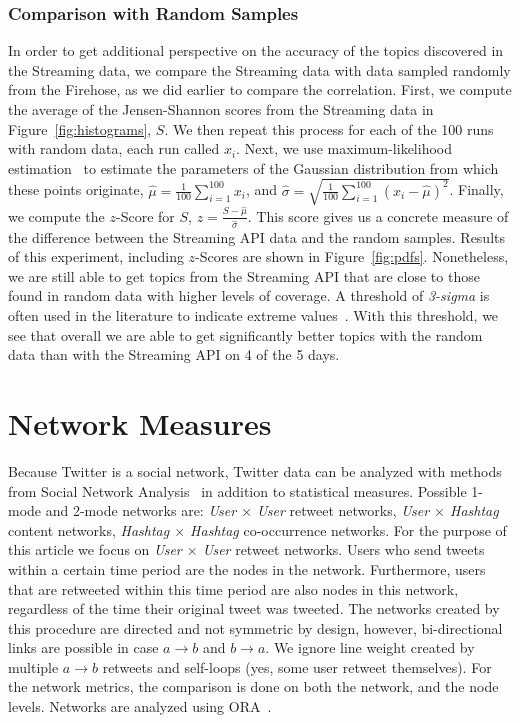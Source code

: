 \documentclass[letterpaper]{article}
\begin{document}
\subsubsection{Comparison with Random Samples}
In order to get additional perspective on the accuracy of the topics discovered in the Streaming data, we compare the Streaming data with data sampled randomly from the Firehose, as we did earlier to compare the correlation. First, we compute the average of the Jensen-Shannon scores from the Streaming data in Figure~\ref{fig:histograms}, $S$. We then repeat this process for each of the 100 runs with random data, each run called $x_i$. Next, we use maximum-likelihood estimation~\cite{casella2001statistical} to estimate the parameters of the Gaussian distribution from which these points originate, $\hat{\mu} = \frac{1}{100} \sum_{i = 1}^{100} x_i$, and $\hat{\sigma} = \sqrt{\frac{1}{100}\sum_{i = 1}^{100}(x_i - \hat{\mu})^2}$. Finally, we compute the $z$-Score for $S$, $z = \frac{S - \hat{\mu}}{\hat{\sigma}}$. This score gives us a concrete measure of the difference between the Streaming API data and the random samples. Results of this experiment, including $z$-Scores are shown in Figure~\ref{fig:pdfs}. Nonetheless, we are still able to get topics from the Streaming API that are close to those found in random data with higher levels of coverage. A threshold of \emph{3-sigma} is often used in the literature to indicate extreme values~\cite[Section 6.3.1]{nist02}. With this threshold, we see that overall we are able to get significantly better topics with the random data than with the Streaming API on 4 of the 5 days.

\section{Network Measures}
Because Twitter is a social network, Twitter data can be analyzed with methods from Social Network Analysis~\cite{Wasserman1994} in addition to statistical measures. Possible 1-mode and 2-mode networks are: \emph{User $\times$ User} retweet networks, \emph{User $\times$ Hashtag} content networks, \emph{Hashtag $\times$ Hashtag} co-occurrence networks. For the purpose of this article we focus on \emph{User $\times$ User} retweet networks. Users who send tweets within a certain time period are the nodes in the network. Furthermore, users that are retweeted within this time period are also nodes in this network, regardless of the time their original tweet was tweeted.
The networks created by this procedure are directed and not symmetric by design, however, bi-directional links are possible in case $a \rightarrow b$ and $b \rightarrow a$. We ignore line weight created by multiple $a \rightarrow b$ retweets and self-loops (yes, some user retweet themselves). For the network metrics, the comparison is done on both the network, and the node levels. Networks are analyzed using ORA~\cite{ora2012}.
\end{document}
